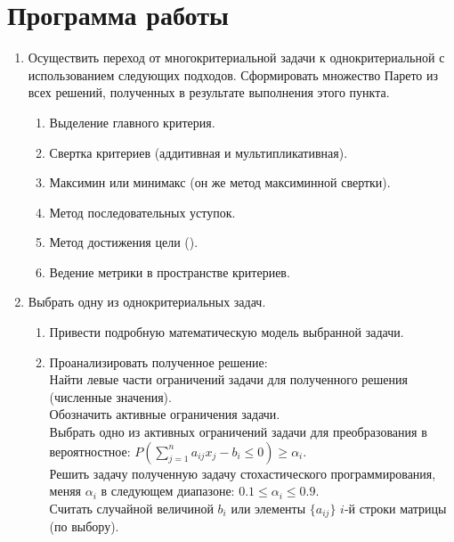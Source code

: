





\tableofcontents
\newpage

\section{Программа работы}

\begin{enumerate}
	\item Осуществить переход от многокритериальной задачи к однокритериальной с использованием следующих подходов.  Сформировать множество Парето из всех решений, полученных в результате выполнения этого пункта.
		\begin{enumerate}
			\item Выделение главного критерия.
			\item Свертка критериев (аддитивная и мультипликативная).
			\item Максимин или минимакс (он же метод максиминной свертки).
			\item Метод последовательных уступок.
			\item Метод достижения цели (). 
			\item Ведение метрики в пространстве критериев.
		\end{enumerate}
	\item Выбрать одну из однокритериальных задач.
		\begin{enumerate}
			\item Привести подробную математическую модель выбранной задачи.
			\item Проанализировать полученное решение:\\
			Найти левые части ограничений задачи для полученного решения (численные значения).\\
			Обозначить активные ограничения задачи.\\
			Выбрать одно из активных ограничений задачи для преобразования в вероятностное: 
			$P\left( \sum_{j=1}^n a_{ij} x_j - b_i \leq 0 \right) \geq \alpha_i$.\\
			Решить задачу полученную задачу стохастического программирования, меняя $\alpha_i$ в следующем диапазоне: $0.1 \leq \alpha_i \leq 0.9$.\\
			Считать случайной величиной $b_i$ или элементы $\{a_{ij}\}$ $i$-й строки матрицы    (по выбору).
		\end{enumerate}
\end{enumerate}

